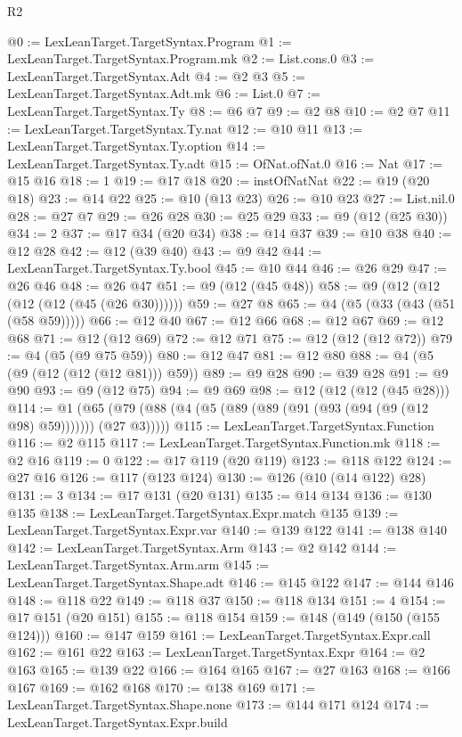 \begin{lexlean}{R2}
\begin{coremodule}
@0 := LexLeanTarget.TargetSyntax.Program
@1 := LexLeanTarget.TargetSyntax.Program.mk
@2 := List.cons.{0}
@3 := LexLeanTarget.TargetSyntax.Adt
@4 := @2 @3
@5 := LexLeanTarget.TargetSyntax.Adt.mk
@6 := List.{0}
@7 := LexLeanTarget.TargetSyntax.Ty
@8 := @6 @7
@9 := @2 @8
@10 := @2 @7
@11 := LexLeanTarget.TargetSyntax.Ty.nat
@12 := @10 @11
@13 := LexLeanTarget.TargetSyntax.Ty.option
@14 := LexLeanTarget.TargetSyntax.Ty.adt
@15 := OfNat.ofNat.{0}
@16 := Nat
@17 := @15 @16
@18 := 1
@19 := @17 @18
@20 := instOfNatNat
@22 := @19 (@20 @18)
@23 := @14 @22
@25 := @10 (@13 @23)
@26 := @10 @23
@27 := List.nil.{0}
@28 := @27 @7
@29 := @26 @28
@30 := @25 @29
@33 := @9 (@12 (@25 @30))
@34 := 2
@37 := @17 @34 (@20 @34)
@38 := @14 @37
@39 := @10 @38
@40 := @12 @28
@42 := @12 (@39 @40)
@43 := @9 @42
@44 := LexLeanTarget.TargetSyntax.Ty.bool
@45 := @10 @44
@46 := @26 @29
@47 := @26 @46
@48 := @26 @47
@51 := @9 (@12 (@45 @48))
@58 := @9 (@12 (@12 (@12 (@12 (@45 (@26 @30))))))
@59 := @27 @8
@65 := @4 (@5 (@33 (@43 (@51 (@58 @59)))))
@66 := @12 @40
@67 := @12 @66
@68 := @12 @67
@69 := @12 @68
@71 := @12 (@12 @69)
@72 := @12 @71
@75 := @12 (@12 (@12 @72))
@79 := @4 (@5 (@9 @75 @59))
@80 := @12 @47
@81 := @12 @80
@88 := @4 (@5 (@9 (@12 (@12 (@12 @81))) @59))
@89 := @9 @28
@90 := @39 @28
@91 := @9 @90
@93 := @9 (@12 @75)
@94 := @9 @69
@98 := @12 (@12 (@12 (@45 @28)))
@114 := @1 (@65 (@79 (@88 (@4 (@5 (@89 (@89 (@91 (@93 (@94 (@9 (@12 @98) @59))))))) (@27 @3)))))
@115 := LexLeanTarget.TargetSyntax.Function
@116 := @2 @115
@117 := LexLeanTarget.TargetSyntax.Function.mk
@118 := @2 @16
@119 := 0
@122 := @17 @119 (@20 @119)
@123 := @118 @122
@124 := @27 @16
@126 := @117 (@123 @124)
@130 := @126 (@10 (@14 @122) @28)
@131 := 3
@134 := @17 @131 (@20 @131)
@135 := @14 @134
@136 := @130 @135
@138 := LexLeanTarget.TargetSyntax.Expr.match @135
@139 := LexLeanTarget.TargetSyntax.Expr.var
@140 := @139 @122
@141 := @138 @140
@142 := LexLeanTarget.TargetSyntax.Arm
@143 := @2 @142
@144 := LexLeanTarget.TargetSyntax.Arm.arm
@145 := LexLeanTarget.TargetSyntax.Shape.adt
@146 := @145 @122
@147 := @144 @146
@148 := @118 @22
@149 := @118 @37
@150 := @118 @134
@151 := 4
@154 := @17 @151 (@20 @151)
@155 := @118 @154
@159 := @148 (@149 (@150 (@155 @124)))
@160 := @147 @159
@161 := LexLeanTarget.TargetSyntax.Expr.call
@162 := @161 @22
@163 := LexLeanTarget.TargetSyntax.Expr
@164 := @2 @163
@165 := @139 @22
@166 := @164 @165
@167 := @27 @163
@168 := @166 @167
@169 := @162 @168
@170 := @138 @169
@171 := LexLeanTarget.TargetSyntax.Shape.none
@173 := @144 @171 @124
@174 := LexLeanTarget.TargetSyntax.Expr.build

\end{coremodule}
\end{lexlean}
